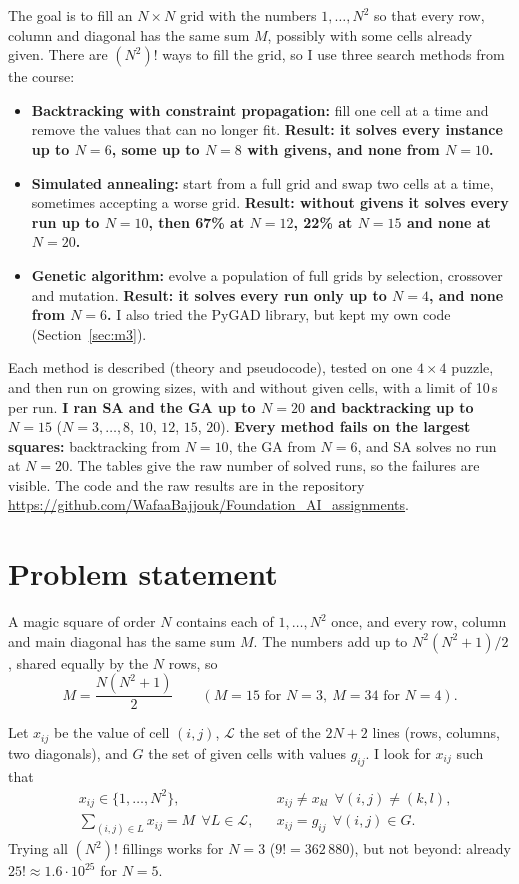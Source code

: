 \documentclass[11pt,a4paper]{article}
\newcommand{\method}[1]{\textcolor{method}{\textbf{#1}}}
\begin{document}
The goal is to fill an $N\times N$ grid with the numbers $1,\dots,N^2$ so
that every row, column and diagonal has the same sum $M$, possibly with
some cells already given. There are $(N^2)!$ ways to fill the grid, so I
use three search methods from the course:
\begin{itemize}[nosep]
  \item \method{Backtracking with constraint propagation:} fill one cell
        at a time and remove the values that can no longer fit.
        \textbf{Result: it solves every instance up to $N=6$, some up to
        $N=8$ with givens, and none from $N=10$.}
  \item \method{Simulated annealing:} start from a full grid and swap two
        cells at a time, sometimes accepting a worse grid.
        \textbf{Result: without givens it solves every run up to $N=10$,
        then 67\% at $N=12$, 22\% at $N=15$ and none at $N=20$.}
  \item \method{Genetic algorithm:} evolve a population of full grids by
        selection, crossover and mutation. \textbf{Result: it solves every
        run only up to $N=4$, and none from $N=6$.} I also tried the PyGAD
        library, but kept my own code (Section~\ref{sec:m3}).
\end{itemize}
Each method is described (theory and pseudocode), tested on one
$4\times4$ puzzle, and then run on growing sizes, with and without given
cells, with a limit of 10\,s per run. \textbf{I ran SA and the GA up to
$N=20$ and backtracking up to $N=15$} ($N=3,\dots,8$, $10$, $12$, $15$,
$20$). \textbf{Every method fails on the largest squares:} backtracking
from $N=10$, the GA from $N=6$, and SA solves no run at $N=20$. The tables
give the raw number of solved runs, so the failures are visible. The code and the raw
results are in the repository
\url{https://github.com/WafaaBajjouk/Foundation_AI_assignments}.

\section{Problem statement}
\label{sec:problem}

A magic square of order $N$ contains each of $1,\dots,N^2$ once, and
every row, column and main diagonal has the same sum $M$. The numbers add
up to $N^2(N^2+1)/2$, shared equally by the $N$ rows, so
\[
M=\frac{N(N^2+1)}{2}\qquad(M=15 \text{ for } N=3,\ M=34 \text{ for } N=4).
\]

Let $x_{ij}$ be the value of cell $(i,j)$, $\mathcal{L}$ the set of the
$2N+2$ lines (rows, columns, two diagonals), and $G$ the set of given
cells with values $g_{ij}$. I look for $x_{ij}$ such that
\begin{align*}
& x_{ij}\in\{1,\dots,N^2\}, && x_{ij}\neq x_{kl}\ \ \forall (i,j)\neq(k,l),\\
& \textstyle\sum_{(i,j)\in L}x_{ij}=M\ \ \forall L\in\mathcal{L}, && x_{ij}=g_{ij}\ \ \forall (i,j)\in G.
\end{align*}
Trying all $(N^2)!$ fillings works for $N=3$ ($9!=362\,880$), but not
beyond: already $25!\approx1.6\cdot10^{25}$ for $N=5$.
\end{document}
